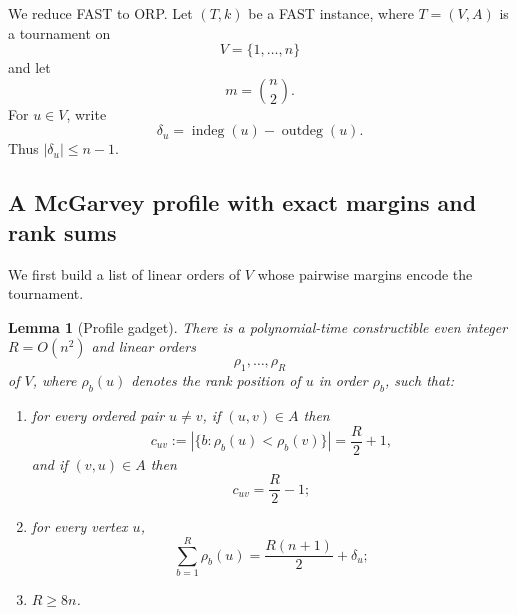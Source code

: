 \documentclass[11pt]{article}
\newtheorem{lemma}{Lemma}
\newcommand{\indeg}{\operatorname{indeg}}
\newcommand{\outdeg}{\operatorname{outdeg}}
\begin{document}
We reduce FAST to ORP.  Let $(T,k)$ be a FAST instance, where $T=(V,A)$ is a tournament on
\begin{equation}
  V=\{1,\ldots,n\}
\end{equation}
and let
\begin{equation}
  m=\binom n2 .
\end{equation}
For $u\in V$, write
\begin{equation}
  \delta_u=\indeg(u)-\outdeg(u).
\end{equation}
Thus $|\delta_u|\le n-1$.

\subsection{A McGarvey profile with exact margins and rank sums}

We first build a list of linear orders of $V$ whose pairwise margins encode the tournament.

\begin{lemma}[Profile gadget]
There is a polynomial-time constructible even integer $R=O(n^2)$ and linear orders
\begin{equation}
  \rho_1,\ldots,\rho_R
\end{equation}
of $V$, where $\rho_b(u)$ denotes the rank position of $u$ in order $\rho_b$, such that:
\begin{enumerate}[label=(\roman*)]
\item for every ordered pair $u\ne v$, if $(u,v)\in A$ then
\begin{equation}
  c_{uv}:=\left|\{b:\rho_b(u)<\rho_b(v)\}\right|=\frac R2+1,
\end{equation}
and if $(v,u)\in A$ then
\begin{equation}
  c_{uv}=\frac R2-1;
\end{equation}
\item for every vertex $u$,
\begin{equation}
  \sum_{b=1}^R \rho_b(u)=\frac{R(n+1)}2+\delta_u;
\end{equation}
\item $R\ge 8n$.
\end{enumerate}
\end{lemma}
\end{document}

